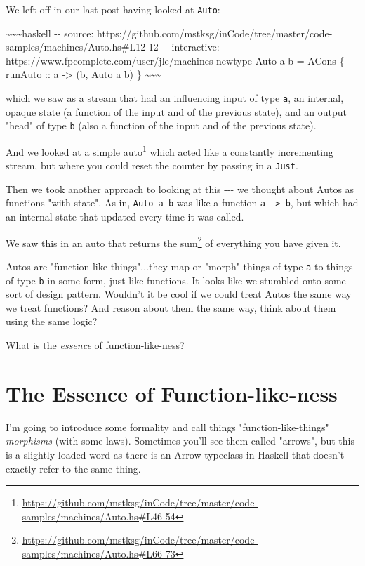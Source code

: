 \documentclass[]{article}
\renewcommand{\href}[2]{#2\footnote{\url{#1}}}
\begin{document}
We left off in our last post having looked at \texttt{Auto}:

\textasciitilde{}\textasciitilde{}\textasciitilde{}haskell -\/- source:
https://github.com/mstksg/inCode/tree/master/code-samples/machines/Auto.hs\#L12-12
-\/- interactive: https://www.fpcomplete.com/user/jle/machines newtype Auto a b
= ACons \{ runAuto :: a -\textgreater{} (b, Auto a b) \}
\textasciitilde{}\textasciitilde{}\textasciitilde{}

which we saw as a stream that had an influencing input of type \texttt{a}, an
internal, opaque state (a function of the input and of the previous state), and
an output "head" of type \texttt{b} (also a function of the input and of the
previous state).

And we looked at
\href{https://github.com/mstksg/inCode/tree/master/code-samples/machines/Auto.hs\#L46-54}{a
simple auto} which acted like a constantly incrementing stream, but where you
could reset the counter by passing in a \texttt{Just}.

Then we took another approach to looking at this -\/-\/- we thought about Autos
as functions "with state". As in, \texttt{Auto\ a\ b} was like a function
\texttt{a\ -\textgreater{}\ b}, but which had an internal state that updated
every time it was called.

We saw this in an auto that
\href{https://github.com/mstksg/inCode/tree/master/code-samples/machines/Auto.hs\#L66-73}{returns
the sum} of everything you have given it.

Autos are "function-like things"...they map or "morph" things of type \texttt{a}
to things of type \texttt{b} in some form, just like functions. It looks like we
stumbled onto some sort of design pattern. Wouldn't it be cool if we could treat
Autos the same way we treat functions? And reason about them the same way, think
about them using the same logic?

What is the \emph{essence} of function-like-ness?

\section{The Essence of Function-like-ness}

I'm going to introduce some formality and call things "function-like-things"
\emph{morphisms} (with some laws). Sometimes you'll see them called "arrows",
but this is a slightly loaded word as there is an Arrow typeclass in Haskell
that doesn't exactly refer to the same thing.
\end{document}
